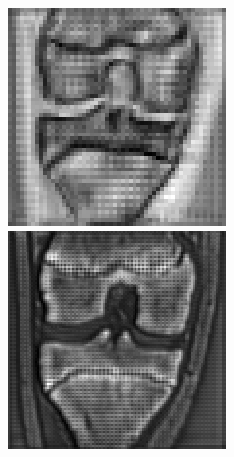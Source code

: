 \begin{figure}[H]
\endminipage
\vspace{0.15cm}
  \includegraphics[width=\linewidth]{imgs/up2.png}
\endminipage\hfill
{}
  \includegraphics[width=\linewidth]{imgs/up3.png}

\end{figure}
